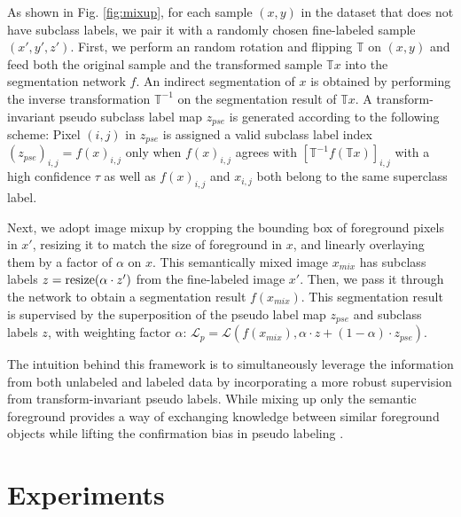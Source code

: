 \documentclass[runningheads]{llncs}
\begin{document}
As shown in Fig. \ref{fig:mixup}, for each sample $(x,y)$ in the dataset that does not have subclass labels, we pair it with a randomly chosen fine-labeled sample $(x',y',z')$. First, we perform an random rotation and flipping $\mathbb{T}$ on $(x,y)$ and feed both the original sample and the transformed sample $\mathbb{T}x$ into the segmentation network $f$. An indirect segmentation of $x$ is obtained by performing the inverse transformation $\mathbb{T}^{-1}$ on the segmentation result of $\mathbb{T}x$. A transform-invariant pseudo subclass label map $z_{pse}$ is generated according to the following scheme: Pixel $(i,j)$ in $z_{pse}$ is assigned a valid subclass label index $(z_{pse})_{i,j}=f(x)_{i,j}$ only when $f(x)_{i,j}$ agrees with $[\mathbb{T}^{-1}f(\mathbb{T}x)]_{i,j}$ with a high confidence $\tau$ as well as $f(x)_{i,j}$ and $x_{i,j}$ both belong to the same superclass label.

Next, we adopt image mixup by cropping the bounding box of foreground pixels in $x'$, resizing it to match the size of foreground in $x$, and linearly overlaying them by a factor of $\alpha$ on $x$. This semantically mixed image $x_{mix}$ has subclass labels $z=\textnormal{resize}(\alpha\cdot z')$ from the fine-labeled image $x'$. Then, we pass it through the network to obtain a segmentation result $f(x_{mix})$. This segmentation result is supervised by the superposition of the pseudo label map $z_{pse}$ and subclass labels $z$, with weighting factor $\alpha$: $\mathcal{L}_p=\mathcal{L}(f(x_{mix}), \alpha\cdot z+(1-\alpha)\cdot z_{pse})$.

The intuition behind this framework is to simultaneously leverage the information from both unlabeled and labeled data by incorporating a more robust supervision from transform-invariant pseudo labels. While mixing up only the semantic foreground provides a way of exchanging knowledge between similar foreground objects while lifting the confirmation bias in pseudo labeling \cite{Eric2019}.

\section{Experiments}
\end{document}
